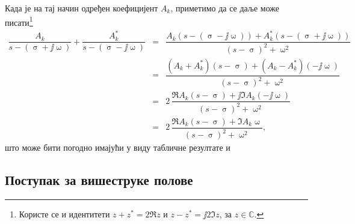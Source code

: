 \begin{center}
    \end{center}

Када је на тај начин одређен  коефицијент $A_k$, приметимо да се даље може писати\footnote{Користе се и идентитети 
$z + z^* = 2\Re{z}$ и 
$z - z^* = \jj 2 \Im{z}$, за $z \in \mathbb C$. }
\begin{eqnarray}
    \dfrac{A_k}{s-(\upsigma + \jj\upomega)}  + 
    \dfrac{A_k^*}{s-(\upsigma - \jj\upomega)}  
    &=&  
    \dfrac{ A_k(s-(\upsigma - \jj\upomega)) + A_k^* (s-(\upsigma + \jj\upomega))}{(s-\upsigma)^2 + \upomega^2}  
    \\ 
    &=&
    \dfrac{ (A_k + A_k^*) (s - \upsigma) + (A_k - A_k^*) (-\jj\upomega)   }{(s-\upsigma)^2 + \upomega^2}     
    \\
    &=&
    2\,\dfrac{ \Re{A_k} (s - \upsigma) + \jj \Im{A_k} (-\jj\upomega)   }{(s-\upsigma)^2 + \upomega^2}     
    \\
    &=&
    2\,\dfrac{ \Re{A_k} (s - \upsigma) + \Im{A_k} \upomega   }{(s-\upsigma)^2 + \upomega^2},    
\end{eqnarray}
што може бити погодно имајући у виду табличне резултате  и 

\subsection*{Поступак за вишеструке полове}

